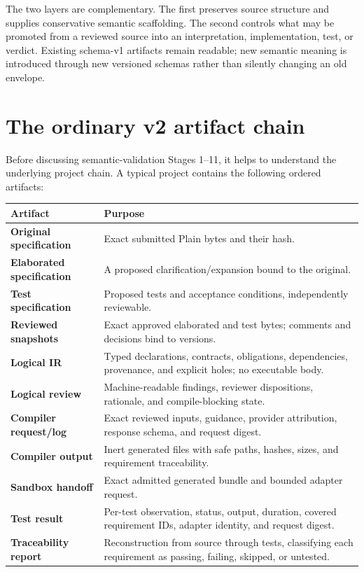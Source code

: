 \documentclass[11pt]{article}
\begin{document}
The two layers are complementary.  The first preserves source structure and
supplies conservative semantic scaffolding.  The second controls what may be
promoted from a reviewed source into an interpretation, implementation, test,
or verdict.  Existing schema-v1 artifacts remain readable; new semantic
meaning is introduced through new versioned schemas rather than silently
changing an old envelope.

\section{The ordinary v2 artifact chain}

Before discussing semantic-validation Stages 1--11, it helps to understand
the underlying project chain.  A typical project contains the following
ordered artifacts:

\begin{center}
\small
\begin{tabularx}{0.96\textwidth}{@{}>{\bfseries}lX@{}}
\toprule
Artifact & Purpose \\
\midrule
Original specification & Exact submitted Plain bytes and their hash. \\
Elaborated specification & A proposed clarification/expansion bound to the original. \\
Test specification & Proposed tests and acceptance conditions, independently reviewable. \\
Reviewed snapshots & Exact approved elaborated and test bytes; comments and decisions bind to versions. \\
Logical IR & Typed declarations, contracts, obligations, dependencies, provenance, and explicit holes; no executable body. \\
Logical review & Machine-readable findings, reviewer dispositions, rationale, and compile-blocking state. \\
Compiler request/log & Exact reviewed inputs, guidance, provider attribution, response schema, and request digest. \\
Compiler output & Inert generated files with safe paths, hashes, sizes, and requirement traceability. \\
Sandbox handoff & Exact admitted generated bundle and bounded adapter request. \\
Test result & Per-test observation, status, output, duration, covered requirement IDs, adapter identity, and request digest. \\
Traceability report & Reconstruction from source through tests, classifying each requirement as passing, failing, skipped, or untested. \\
\bottomrule
\end{tabularx}
\end{center}
\end{document}
